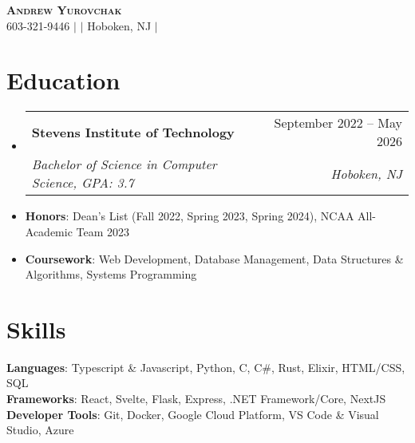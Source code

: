 \documentclass[letterpaper,11pt]{article}
\makeatletter
\newcommand{\resumeItem}[1]{
  \item\small{
    {#1 \vspace{-2pt}}
  }
}
\newcommand{\resumeSubheading}[4]{
  \vspace{-2pt}\item
    \begin{tabular*}{0.97\textwidth}[t]{l@{\extracolsep{\fill}}r}
      \textbf{#1} & #2 \\
      \textit{\small#3} & \textit{\small #4} \\
    \end{tabular*}\vspace{-7pt}
}
\newcommand{\resumeSubItem}[1]{\resumeItem{#1}\vspace{-5pt}}
\newcommand{\resumeSubHeadingListStart}{\begin{itemize}[leftmargin=0.15in, label={}]}
\newcommand{\resumeSubHeadingListEnd}{\end{itemize}}
\makeatother
\begin{document}

\begin{center}
    \textbf{\Huge \scshape Andrew Yurovchak} \\ \vspace{3pt}
    \small 603-321-9446 $|$ \href{mailto:andy@yurovchak.net}{\underline{}} $|$ \small{Hoboken, NJ} $|$
    \href{https://portfolio.baetylboy.biz}{\underline{}} \\ \vspace{-7pt}
\end{center}


\section{Education}
  \resumeSubHeadingListStart
    \resumeSubheading
      {Stevens Institute of Technology}{September 2022 -- May 2026}
      {Bachelor of Science in Computer Science, GPA: 3.7}{Hoboken, NJ}
    \resumeSubItem{\textbf{Honors}: Dean's List (Fall 2022, Spring 2023, Spring 2024), NCAA All-Academic Team 2023}
    \resumeSubItem{\textbf{Coursework}: Web Development, Database Management, Data Structures \& Algorithms, Systems Programming}
  \resumeSubHeadingListEnd


\section{Skills}
 \begin{itemize}[leftmargin=0.15in, label={}]
    \small{\item{
     \textbf{Languages}{: Typescript \& Javascript, Python, C, C\#, Rust, Elixir, HTML/CSS, SQL} \\
     \textbf{Frameworks}{: React, Svelte, Flask, Express, .NET Framework/Core, NextJS} \\
     \textbf{Developer Tools}{: Git, Docker, Google Cloud Platform, VS Code \& Visual Studio, Azure}
    }}
 \end{itemize}
\end{document}
